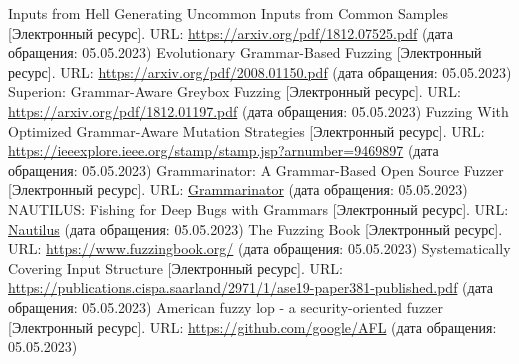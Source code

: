 \documentclass[a4paper]{article}
\begin{document}
\begin{thebibliography}{}
      Inputs from Hell Generating Uncommon Inputs from Common Samples [Электронный ресурс]. URL: \href{https://arxiv.org/pdf/1812.07525.pdf}{https://arxiv.org/pdf/1812.07525.pdf} (дата обращения: 05.05.2023)
      Evolutionary Grammar-Based Fuzzing [Электронный ресурс]. URL: \href{https://arxiv.org/pdf/2008.01150.pdf}{https://arxiv.org/pdf/2008.01150.pdf} (дата обращения: 05.05.2023)
      Superion: Grammar-Aware Greybox Fuzzing [Электронный ресурс]. URL: \href{https://arxiv.org/pdf/1812.01197.pdf}{https://arxiv.org/pdf/1812.01197.pdf} (дата обращения: 05.05.2023)
      Fuzzing With Optimized Grammar-Aware
    Mutation Strategies [Электронный ресурс]. URL: \href{https://ieeexplore.ieee.org/stamp/stamp.jsp?arnumber=9469897}{https://ieeexplore.ieee.org/stamp/stamp.jsp?arnumber=9469897} (дата обращения: 05.05.2023)
      Grammarinator:
    A Grammar-Based Open Source Fuzzer [Электронный ресурс]. 
    URL: \href{https://www.researchgate.net/publication/328510752\_Grammarinator\_a\_grammar-based\_open\_source\_fuzzer}{Grammarinator}
    (дата обращения: 05.05.2023)
      NAUTILUS:
    Fishing for Deep Bugs with Grammars [Электронный ресурс]. URL: \href{https://www.ndss-symposium.org/wp-content/uploads/2019/02/ndss2019\_04A-3\_Aschermann\_paper.pdf}{Nautilus} (дата обращения: 05.05.2023)
      The Fuzzing Book [Электронный ресурс]. URL: \href{https://www.fuzzingbook.org/}{https://www.fuzzingbook.org/} (дата обращения: 05.05.2023)
      Systematically Covering Input Structure [Электронный ресурс]. URL: \href{https://publications.cispa.saarland/2971/1/ase19-paper381-published.pdf}{https://publications.cispa.saarland/2971/1/ase19-paper381-published.pdf} (дата обращения: 05.05.2023)
      American fuzzy lop - a security-oriented fuzzer [Электронный ресурс]. URL: \href{https://github.com/google/AFL}{https://github.com/google/AFL} (дата обращения: 05.05.2023)
\end{thebibliography}

\newpage

\appendix
\end{document}
